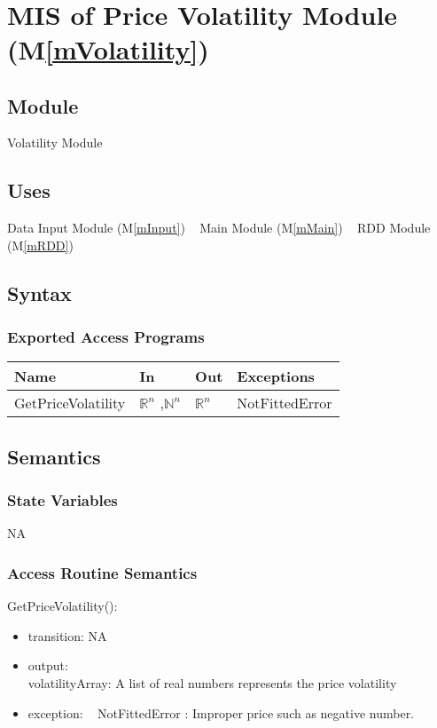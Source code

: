 \documentclass[12pt, titlepage]{article}
\newcommand{\mref}[1]{M\ref{#1}}
\begin{document}
~\newpage


\section{MIS of Price Volatility Module (\mref{mVolatility}) } 

\subsection{Module}
Volatility Module
\subsection{Uses}
Data Input Module (\mref{mInput})
~\newline
Main Module (\mref{mMain})
~\newline
 RDD Module (\mref{mRDD})
\subsection{Syntax}

\subsubsection{Exported Access Programs}

\begin{center}
\begin{tabular}{p{4cm} p{2cm} p{2cm} p{4cm}}
\hline
\textbf{Name} & \textbf{In} & \textbf{Out} & \textbf{Exceptions} \\
\hline

GetPriceVolatility & $\mathbb{R}^n$ ,$\mathbb{N}^n$ & $\mathbb{R}^n$ & NotFittedError \\
\hline
\end{tabular}
\end{center}

\subsection{Semantics}
\subsubsection{State Variables}
NA

\subsubsection{Access Routine Semantics}

\noindent GetPriceVolatility():
\begin{itemize}
\item transition: NA
\item output: \\
volatilityArray: A list of real numbers represents the price volatility
\item exception:
~\newline
NotFittedError : Improper price such as negative number.
\end{itemize}
\end{document}

